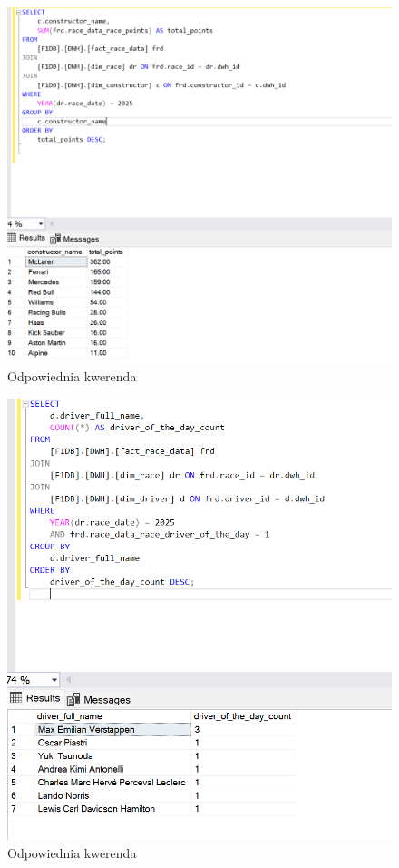 \documentclass[12pt]{article}
\begin{document}
\begin{figure}[H]
    \centering   \includegraphics[width=\textwidth]{t2.png}
    \caption{Odpowiednia kwerenda}
\end{figure}

\begin{figure}[H]
    \centering   \includegraphics[width=\textwidth]{t3.png}
    \caption{Odpowiednia kwerenda}
\end{figure}
\end{document}
